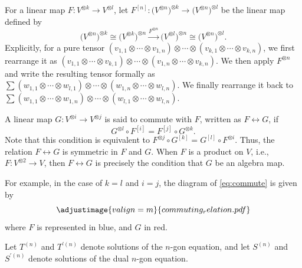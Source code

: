 \documentclass[pdftex]{sigma}
\numberwithin{equation}{section}
\theoremstyle{definition}
\begin{document}
For a linear map $F\colon V^{\otimes k}\to V^{\otimes l}$, let $F^{[n]}\colon \bigl(V^{\otimes n}\bigr)^{\otimes k} \to \bigl(V^{\otimes n}\bigr)^{\otimes l}$ be the linear map defined by
\begin{equation*}
\bigl(V^{\otimes n}\bigr)^{\otimes k}\cong \bigl(V^{\otimes k}\bigr)^{\otimes n} \xrightarrow{F^{\otimes n}} \bigl(V^{\otimes l}\bigr)^{\otimes n}\cong \bigl(V^{\otimes n}\bigr)^{\otimes l}.
\end{equation*}
Explicitly, for a pure tensor $(v_{1,1}\otimes\cdots\otimes v_{1,n})\otimes\cdots\otimes
(v_{k,1}\otimes\cdots\otimes v_{k,n})$, we first rearrange it as $(v_{1,1}\otimes\cdots\otimes v_{k,1})\otimes\cdots\otimes
(v_{1,n}\otimes\cdots\otimes v_{k,n})$. We then apply $F^{\otimes n}$ and write the resulting tensor formally as $\sum
(w_{1,1}\otimes\cdots\otimes w_{l,1})\otimes\cdots\otimes
(w_{1,n}\otimes\cdots\otimes w_{l,n})$. We finally rearrange it back to $\sum
(w_{1,1}\otimes\cdots\otimes w_{1,n})\otimes\cdots\otimes
(w_{l,1}\otimes\cdots\otimes w_{l,n})$.

A linear map $G\colon V^{\otimes i}\to V^{\otimes j}$ is said to commute with $F$, written as $F \leftrightarrow G$, if
\begin{equation}
G^{\otimes l}\circ F^{[i]} = F^{[j]}\circ G^{\otimes k}.\label{eq:commute}
\end{equation}
Note that this condition is equivalent to $F^{\otimes j}\circ G^{[k]} = G^{[l]}\circ F^{\otimes i}$. Thus, the relation $F \leftrightarrow G$ is symmetric in $F$ and $G$.
When $F$ is a product on $V$, i.e., $F\colon V^{\otimes 2}\to V$, then $F\leftrightarrow G$ is precisely the condition that $G$ be an algebra map.

For example, in the case of $k=l$ and $i=j$, the diagram of \eqref{eq:commute} is given by
\begin{equation*}
 \adjustimage{valign=m}{commuting_relation.pdf}
\end{equation*}
where $F$ is represented in blue, and $G$ in red.

Let $T^{(n)}$ and $T^{\prime(n)}$ denote solutions of the $n$-gon equation, and let $S^{(n)}$ and $S^{\prime(n)}$ denote solutions of the dual $n$-gon equation.
\end{document}

